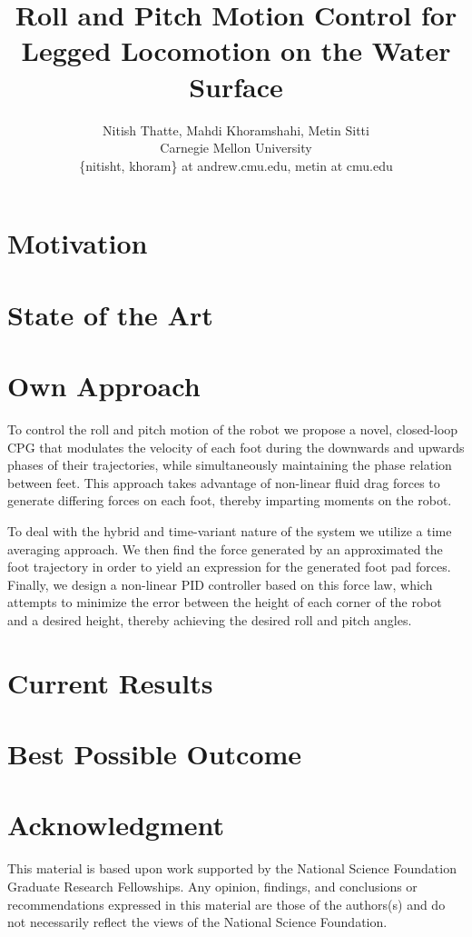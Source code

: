 \documentclass[letterpaper,twocolumn]{article}
\title{Roll and Pitch Motion Control for Legged Locomotion on the Water Surface}
\author{\small Nitish Thatte, Mahdi Khoramshahi, Metin Sitti \\
        \small Carnegie Mellon University \\
        \small \{nitisht, khoram\} at andrew.cmu.edu, metin at cmu.edu
}
\date{}
\begin{document}
\maketitle

\section{Motivation}


\section{State of the Art}


\section{Own Approach}
To control the roll and pitch motion of the robot we propose a novel, closed-loop CPG that modulates the velocity of each foot during the downwards and upwards phases of their trajectories, while simultaneously maintaining the phase relation between feet. This approach takes advantage of non-linear fluid drag forces to generate differing forces on each foot, thereby imparting moments on the robot. 
	
To deal with the hybrid and time-variant nature of the system we utilize a time averaging approach. We then find the force generated by an approximated the foot trajectory in order to yield an expression for the generated foot pad forces. Finally, we design a non-linear PID controller based on this force law, which attempts to minimize the error between the height of each corner of the robot and a desired height, thereby achieving the desired roll and pitch angles.

\section{Current Results}

\section{Best Possible Outcome}

\section*{Acknowledgment}
This material is based upon work supported by the National Science Foundation Graduate Research Fellowships. Any opinion, findings, and conclusions or recommendations expressed in this material are those of the authors(s) and do not necessarily reflect the views of the National Science Foundation.



\end{document}
